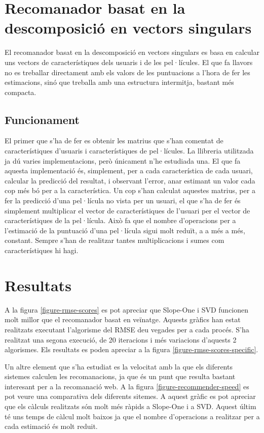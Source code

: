 \section{Recomanador basat en la descomposició en vectors singulars}

El recomanador basat en la descomposició en vectors singulars es basa en calcular uns vectors de característiques dels usuaris i de les pel·lícules. El que fa llavors no es treballar directament amb els valors de les puntuacions a l'hora de fer les estimacions, sinó que treballa amb una estructura intermitja, bastant més compacta.

\subsection{Funcionament}

El primer que s'ha de fer es obtenir les matrius que s'han comentat de característiques d'usuaris i característiques de pel·lícules. La llibreria utilitzada ja dú varies implementacions, però únicament n'he estudiada una. El que fa aquesta implementació és, simplement, per a cada característica de cada usuari, calcular la predicció del resultat, i observant l'error, anar estimant un valor cada cop més bó per a la característica. Un cop s'han calculat aquestes matrius, per a fer la predicció d'una pel·lícula no vista per un usuari, el que s'ha de fer és simplement multiplicar el vector de característiques de l'usuari per el vector de característiques de la pel·lícula. Això fa que el nombre d'operacions per a l'estimació de la puntuació d'una pel·lícula sigui molt reduït, a a més a més, constant. Sempre s'han de realitzar tantes multiplicacions i sumes com característiques hi hagi.

\section{Resultats}

A la figura \ref{figure-rmse-scores} es pot apreciar que Slope-One i SVD funcionen molt millor que el recomanador basat en veïnatge. Aquests gràfics han estat realitzats executant l'algorisme del RMSE deu vegades per a cada procés. S'ha realitzat una segona execució, de 20 iteracions i més variacions d'aquests 2 algorismes. Els resultats es poden apreciar a la figura \ref{figure-rmse-scores-specific}.

Un altre element que s'ha estudiat es la velocitat amb la que els diferents sistemes calculen les recomanacions, ja que és un punt que resulta bastant interesant per a la recomanació web. A la figura \ref{figure-recommender-speed} es pot veure una comparativa dels diferents sitemes. A aquest gràfic es pot apreciar que els càlculs realitzats són molt més ràpids a Slope-One i a SVD. Aquest últim té uns temps de càlcul molt baixos ja que el nombre d'operacions a realitzar per a cada estimació és molt reduit.

